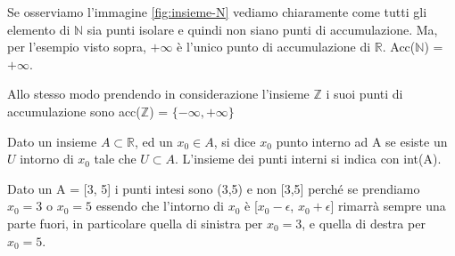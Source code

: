 Se osserviamo l'immagine \ref{fig:insieme-N} vediamo chiaramente come tutti gli elemento di $\mathbb{N}$ sia punti isolare e quindi non siano punti di accumulazione. Ma, per l'esempio visto sopra, $+\infty$ è l'unico punto di accumulazione di $\mathbb{R}$. Acc($\mathbb{N}$) = $+\infty$. \\
\begin{note}
    Allo stesso modo prendendo in considerazione l'insieme $\mathbb{Z}$ i suoi punti di accumulazione sono acc($\mathbb{Z}$) = $\{-\infty, +\infty\}$
\end{note}
\begin{definition}
    Dato un insieme $A \subset \mathbb{R}$, ed un $x_0 \in A$, si dice $x_0$ punto interno ad A se esiste un $U$ intorno di $x_0$ tale che $U \subset A$. L'insieme dei punti interni si indica con int(A).
\end{definition}
\begin{example}
    Dato un A = [3, 5] i punti intesi sono (3,5) e non [3,5] perché se prendiamo $x_0 = 3$ o $x_0 = 5$ essendo che l'intorno di $x_0$ è [$x_0 - \epsilon$, $x_0 + \epsilon$] rimarrà sempre una parte fuori, in particolare quella di sinistra per $x_0 = 3$, e quella di destra per $x_0 = 5$.
\end{example}

